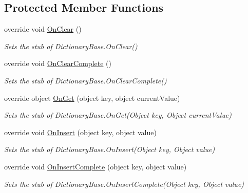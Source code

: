 \subsection*{Protected Member Functions}
\begin{DoxyCompactItemize}
\item 
override void \hyperlink{class_system_1_1_diagnostics_1_1_fakes_1_1_stub_instance_data_collection_collection_af9260b82589a9821e4ec24584e539352}{On\-Clear} ()
\begin{DoxyCompactList}\small\item\em Sets the stub of Dictionary\-Base.\-On\-Clear()\end{DoxyCompactList}\item 
override void \hyperlink{class_system_1_1_diagnostics_1_1_fakes_1_1_stub_instance_data_collection_collection_a52d22f293cb67116fd4ae1f538b1857f}{On\-Clear\-Complete} ()
\begin{DoxyCompactList}\small\item\em Sets the stub of Dictionary\-Base.\-On\-Clear\-Complete()\end{DoxyCompactList}\item 
override object \hyperlink{class_system_1_1_diagnostics_1_1_fakes_1_1_stub_instance_data_collection_collection_a7db9c064505eb0714740ca25fdcc35a6}{On\-Get} (object key, object current\-Value)
\begin{DoxyCompactList}\small\item\em Sets the stub of Dictionary\-Base.\-On\-Get(\-Object key, Object current\-Value)\end{DoxyCompactList}\item 
override void \hyperlink{class_system_1_1_diagnostics_1_1_fakes_1_1_stub_instance_data_collection_collection_abddd5d1bef46841ab9beecf9fcc236a4}{On\-Insert} (object key, object value)
\begin{DoxyCompactList}\small\item\em Sets the stub of Dictionary\-Base.\-On\-Insert(\-Object key, Object value)\end{DoxyCompactList}\item 
override void \hyperlink{class_system_1_1_diagnostics_1_1_fakes_1_1_stub_instance_data_collection_collection_a34453189c8f8d9ced394e6eef5bcc2ed}{On\-Insert\-Complete} (object key, object value)
\begin{DoxyCompactList}\small\item\em Sets the stub of Dictionary\-Base.\-On\-Insert\-Complete(\-Object key, Object value)\end{DoxyCompactList}\item 

\end{DoxyCompactItemize}
